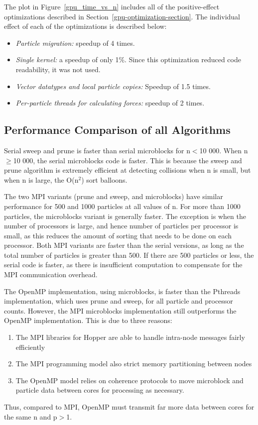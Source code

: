 \documentclass[11pt]{article} %
\begin{document}
The plot in Figure~\ref{gpu_time_vs_n} includes all of the positive-effect optimizations described in Section~\ref{gpu-optimization-section}. The individual effect of each of the optimizations is described below:

\begin{itemize}
\item {\em Particle migration: } speedup of 4 times.
\item {\em Single kernel: } a speedup of only 1\%. Since this optimization reduced code readability, it was not used.
\item {\em Vector datatypes and local particle copies: } Speedup of 1.5 times.
\item {\em Per-particle threads for calculating forces: } speedup of 2 times.

\end{itemize}

\subsection{Performance Comparison of all Algorithms}

Serial sweep and prune is faster than serial microblocks for n$<$10 000. When n$\geq$10 000, the serial microblocks code is faster. This is because the sweep and prune algorithm is extremely efficient at detecting collisions when n is small, but when n is large, the O(n$^2$) sort balloons.

The two MPI variants (prune and sweep, and microblocks) have similar performance for 500 and 1000 particles at all values of n. For more than 1000 particles, the microblocks variant is generally faster. The exception is when the number of processors is large, and hence number of particles per processor is small, as this reduces the amount of sorting that needs to be done on each processor. Both MPI variants are faster than the serial versions, as long as the total number of particles is greater than 500. If there are 500 particles or less, the serial code is faster, as there is insufficient computation to compensate for the MPI communication overhead.

The OpenMP implementation, using microblocks, is faster than the Pthreads implementation, which uses prune and sweep, for all particle and processor counts. However, the MPI microblocks implementation still outperforms the OpenMP implementation. This is due to three reasons:
\begin{enumerate}
\item The MPI libraries for Hopper are able to handle intra-node messages fairly efficiently
\item The MPI programming model also strict memory partitioning between nodes
\item The OpenMP model relies on coherence protocols to move microblock and particle data between cores for processing as necessary. 
\end{enumerate}
Thus, compared to MPI, OpenMP must transmit far more data between cores for the same n and p$>$1.
\end{document}
